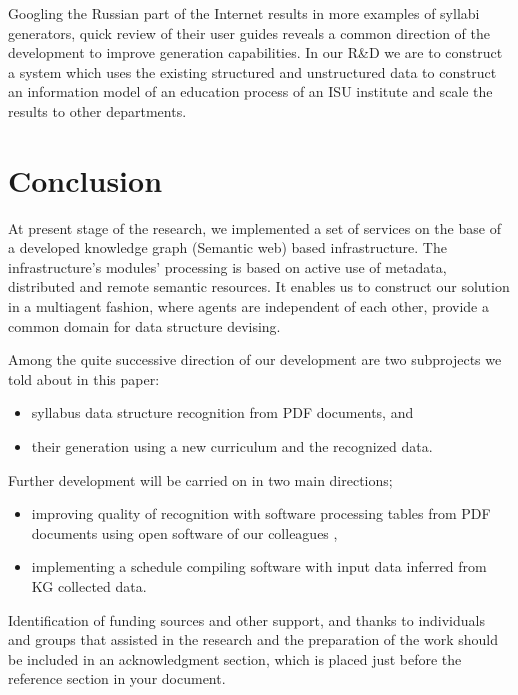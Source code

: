 \documentclass[
]{ceurart}
\begin{document}
Googling the Russian part of the Internet results in more examples of syllabi generators, quick review of their user guides reveals a common direction of the development to improve generation capabilities.  In our R\&D we are to construct a system which uses the existing structured and unstructured data to construct an information model of an education process of an ISU institute and scale the results to other departments.

\section*{Conclusion}

At present stage of the research, we implemented a set of services on the base of a developed knowledge graph (Semantic web) based infrastructure.  The infrastructure's modules' processing is based on active use of metadata, distributed and remote semantic resources.  It enables us to construct our solution in a multiagent fashion, where agents are independent of each other, provide a common domain for data structure devising.

Among the quite successive direction of our development are two subprojects we told about in this paper:
\begin{itemize}
    \item syllabus data structure recognition from PDF documents, and
    \item their generation using a new curriculum and the recognized data.
\end{itemize}
Further development will be carried on in two main directions;
\begin{itemize}
    \item improving quality of recognition with software processing tables from PDF documents using open software of our colleagues \cite{Shigarov_2016,Shigarov_2017},
    \item implementing a schedule compiling software with input data inferred from KG collected data.
\end{itemize}


\begin{acknowledgments}
Identification of funding sources and other support, and thanks to
individuals and groups that assisted in the research and the
preparation of the work should be included in an acknowledgment
section, which is placed just before the reference section in your
document.
\end{acknowledgments}
\end{document}

